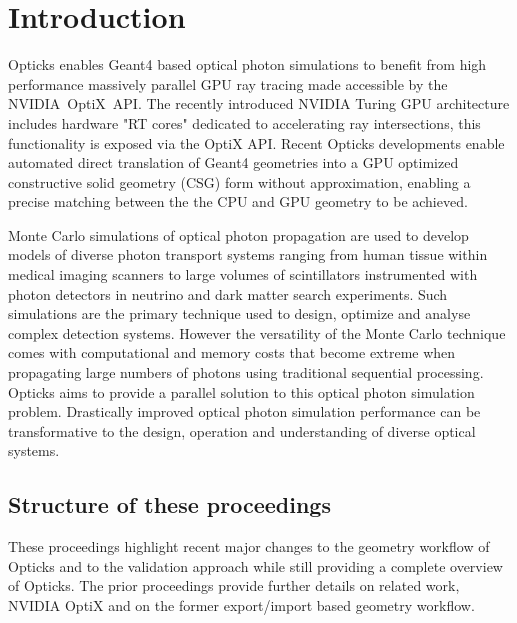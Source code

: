 \documentclass{webofc}
\newcommand{\comment}[1]{}
\begin{document}
\section{Introduction}
\label{intro}
%
\comment{
The introduction should provide background that puts the manuscript into
context and allows readers outside the field to understand the purpose and
significance of the study. It should define the problem addressed and explain
why it is important.
}
%
Opticks\cite{opticksURL} enables Geant4\cite{g4A}\cite{g4B}\cite{g4C}
based optical photon simulations to benefit from high performance massively parallel GPU ray tracing 
made accessible by the NVIDIA\textregistered\ OptiX\texttrademark\ API\cite{optixPaper}\cite{optixSite}.
The recently introduced NVIDIA Turing GPU architecture includes hardware "RT cores" dedicated to
accelerating ray intersections, this functionality is exposed via the OptiX API\cite{rtx}. 
Recent Opticks developments enable automated direct translation of Geant4 geometries into a GPU 
optimized constructive solid geometry (CSG) form without approximation, enabling a precise matching 
between the the CPU and GPU geometry to be achieved. 

Monte Carlo simulations of optical photon propagation 
are used to develop models of diverse photon transport systems 
ranging from human tissue within medical imaging scanners 
to large volumes of scintillators instrumented with photon detectors in neutrino 
and dark matter search experiments. 
Such simulations are the primary technique used to design, optimize 
and analyse complex detection systems. However the versatility 
of the Monte Carlo technique comes with computational and memory costs 
that become extreme when propagating large numbers of photons
using traditional sequential processing. Opticks aims to provide a 
parallel solution to this optical photon simulation problem.  Drastically 
improved optical photon simulation performance can be transformative 
to the design, operation and understanding of diverse optical systems.

\subsection{Structure of these proceedings}  

These proceedings highlight recent major changes to the geometry workflow of Opticks 
and to the validation approach while still providing a complete overview of Opticks. 
The prior proceedings\cite{chep2016} provide further details on related work, NVIDIA OptiX
and on the former export/import based geometry workflow.
\end{document}
